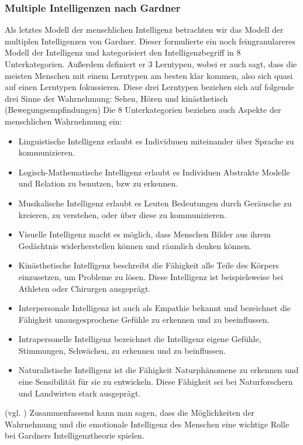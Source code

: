 \documentclass[a4paper, 11pt]{scrartcl}
\begin{document}
\subsubsection{Multiple Intelligenzen nach Gardner}
Als letztes Modell der menschlichen Intelligenz betrachten wir das Modell der multiplen Intelligenzen von Gardner. Dieser formulierte ein noch feingranulareres Modell der Intelligenz und kategorisiert den Intelligenzbegriff in 8 Unterkategorien. Außerdem definiert er 3 Lerntypen, wobei er auch sagt, dass die meisten Menschen mit einem Lerntypen am besten klar kommen, also sich quasi auf einen Lerntypen fokussieren. Diese drei Lerntypen beziehen sich auf folgende drei Sinne der Wahrnehmung: Sehen, Hören und kinästhetisch (Bewegungsempfindungen) Die 8 Unterkategorien beziehen auch Aspekte der menschlichen Wahrnehmung ein:
\begin{itemize}
  \item Linguistische Intelligenz erlaubt es Individuuen miteinander über Sprache zu kommunizieren.
  \item Logisch-Mathematische Intelligenz erlaubt es Individuen Abstrakte Modelle und Relation zu benutzen, bzw zu erkennen.
  \item Musikalische Intelligenz erlaubt es Leuten Bedeutungen durch Geräusche zu kreieren, zu verstehen, oder über diese zu kommunizieren.
  \item Visuelle Intelligenz macht es möglich, dass Menschen Bilder aus ihrem Gedächtnis widerherstellen können und räumlich denken können.
  \item Kinästhetische Intelligenz beschreibt die Fähigkeit alle Teile des Körpers einzusetzen, um Probleme zu lösen. Diese Intelligenz ist beispielsweise bei Athleten oder Chirurgen ausgeprägt.
  \item Interpersonale Intelligenz ist auch als Empathie bekannt und bezeichnet die Fähigkeit unausgesprochene Gefühle zu erkennen und zu beeinflussen.
  \item Intrapersonelle Intelligenz bezeichnet die Intelligenz eigene Gefühle, Stimmungen, Schwächen, zu erkennen und zu beinflussen.
  \item Naturalistische Intelligenz ist die Fähigkeit Naturphänomene zu erkennen und eine Sensibilität für sie zu entwickeln. Diese Fähigkeit sei bei Naturforschern und Landwirten stark ausgeprägt.
\end{itemize}
(vgl. \cite{Gardner1993})
Zusammenfassend kann man sagen, dass die Möglichkeiten der Wahrnehmung und die emotionale Intelligenz des Menschen eine wichtige Rolle bei Gardners Intelligenztheorie spielen.
\end{document}
